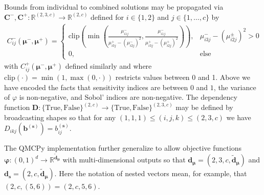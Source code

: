 \documentclass[graybox]{svmult}
\begin{document}
Bounds from individual to combined solutions may be propagated via $\boldsymbol{C}^-,\boldsymbol{C}^+:\mathbb{R}^{(2, 3, c)} \to \mathbb{R}^{(2, c)}$ defined for $i \in \{1,2\}$ and $j \in \{1,\dots,c\}$  by  
\begin{align*}
    C_{ij}^-(\boldsymbol{\mu}^-,\boldsymbol{\mu}^+) 
    = \begin{cases} 
        \text{clip}\left(\min\left(\frac{\mu_{i1j}^-}{\mu_{i3j}^+-\left(\mu_{i2j}^-\right)^2},\frac{\mu_{i1j}^-}{\mu_{i3j}^+-\left(\mu_{i2j}^+\right)^2}\right)\right), & \mu_{i3j}^- - \left(\mu_{i2j}^\pm\right)^2 >0 \\
        0, &\text{else}
     \end{cases} %
\end{align*}
with $C^+_{ij}(\boldsymbol{\mu}^-,\boldsymbol{\mu}^+)$ defined similarly and where $\text{clip}(\cdot) = \min(1,\max(0,\cdot))$ restricts values between 0 and 1. Above we have encoded the facts that sensitivity indices are between $0$ and $1$, the variance of $\varphi$ is non-negative, and Sobol' indices are non-negative. The dependency function $\boldsymbol{D}:\{\text{True},\text{False}\}^{(2, c)} \to \{\text{True},\text{False}\}^{(2, 3, c)}$ may be defined by broadcasting shapes so that for any $(1,1,1) \leq (i,j,k) \leq (2,3,c)$ we have $D_{ikj}(\boldsymbol{b}^{(\boldsymbol{s})}) = b_{ij}^{(\boldsymbol{s})}$. 

The QMCPy implementation further generalize to allow objective functions $\boldsymbol{\varphi}: (0,1)^{d} \to \mathbb{R}^{\tilde{\boldsymbol{d}}_{\boldsymbol{\mu}}}$ with multi-dimensional outputs so that $\boldsymbol{d}_{\boldsymbol{\mu}} = (2,3,c,\tilde{\boldsymbol{d}}_{\boldsymbol{\mu}})$ and $\boldsymbol{d}_{\boldsymbol{s}} = (2,c,\tilde{\boldsymbol{d}}_{\boldsymbol{\mu}})$. Here the notation of nested vectors mean, for example, that  $(2,c,(5,6)) =(2,c,5,6)$.
\end{document}
